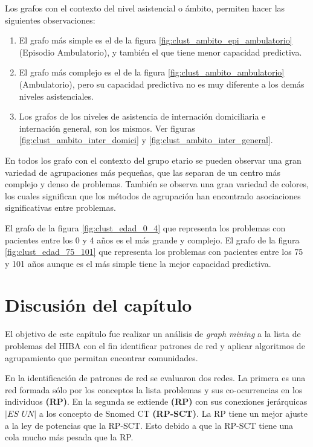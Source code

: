 Los grafos con el contexto del nivel asistencial o ámbito, permiten hacer las siguientes observaciones:

\begin{enumerate}
\item El grafo más simple es el de la figura \ref{fig:clust_ambito_epi_ambulatorio} (Episodio Ambulatorio), y también el que tiene menor capacidad predictiva.
\item El grafo más complejo es el de la figura \ref{fig:clust_ambito_ambulatorio} (Ambulatorio), pero su capacidad predictiva no es muy diferente a los demás niveles asistenciales.
\item Los grafos de los niveles de asistencia de internación domiciliaria e internación general, son los mismos. Ver figuras \ref{fig:clust_ambito_inter_domici}  y \ref{fig:clust_ambito_inter_general}.

\end{enumerate}
En todos los grafo con el contexto del grupo etario se pueden observar una gran variedad de agrupaciones más pequeñas, que las separan de un centro más complejo y denso de problemas. También se observa una gran variedad de colores, los cuales significan que los métodos de agrupación han encontrado asociaciones significativas entre problemas.

El grafo de la figura \ref{fig:clust_edad_0_4} que representa los problemas con pacientes entre los 0 y 4 años es el más grande y complejo. El grafo de la figura \ref{fig:clust_edad_75_101} que representa los problemas con pacientes entre los 75 y 101 años aunque es el más simple tiene la mejor capacidad predictiva.

\section{Discusión del capítulo}
El objetivo de este capítulo fue realizar un análisis de \textit{graph mining} a la lista de problemas del HIBA con el fin identificar patrones de red y aplicar algoritmos de agrupamiento que permitan encontrar comunidades.

En la identificación de patrones de red se evaluaron dos redes. La primera es una red formada sólo por los conceptos la lista problemas y sus co-ocurrencias en los individuos \textbf{(\acrshort{RP})}. En la segunda se extiende \textbf{(\acrshort{RP})} con sus conexiones jerárquicas $|\textit{ES UN}|$ a los concepto de Snomed CT \textbf{(\acrshort{RP-SCT})}. La \acrshort{RP} tiene un mejor ajuste a la ley de potencias que la \acrshort{RP-SCT}. Esto debido a que la \acrshort{RP-SCT} tiene una cola mucho más pesada que la \acrshort{RP}. 

